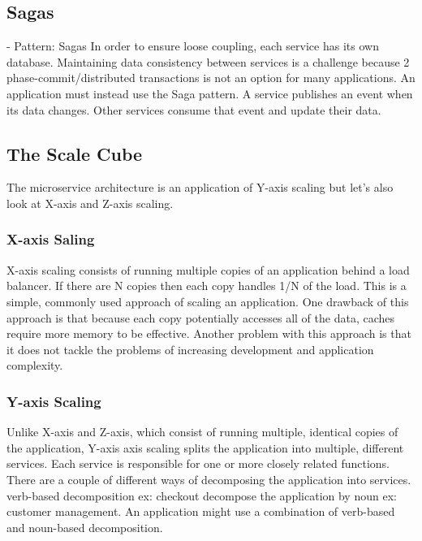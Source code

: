 \subsection{Sagas}
\label{subse:sagas}
- Pattern: Sagas \cite{RichardsonMicroservicesSagas}
  In order to ensure loose coupling, each service has its own database. Maintaining data consistency between services is a challenge because 2 phase-commit/distributed transactions is not an option for many applications. An application must instead use the Saga pattern. A service publishes an event when its data changes. Other services consume that event and update their data.

\subsection{The Scale Cube}
\label{subse:scale_cube}
The microservice architecture is an application of Y-axis scaling but let’s also look at X-axis and Z-axis scaling.

\subsubsection{X-axis Saling}
X-axis scaling consists of running multiple copies of an application behind a load balancer. If there are N copies then each copy handles 1/N of the load. This is a simple, commonly used approach of scaling an application.
One drawback of this approach is that because each copy potentially accesses all of the data, caches require more memory to be effective. Another problem with this approach is that it does not tackle the problems of increasing development and application complexity.

\subsubsection{Y-axis Scaling}
Unlike X-axis and Z-axis, which consist of running multiple, identical copies of the application, Y-axis axis scaling splits the application into multiple, different services. Each service is responsible for one or more closely related functions. There are a couple of different ways of decomposing the application into services.
verb-based decomposition ex: checkout
decompose the application by noun ex: customer management. 
An application might use a combination of verb-based and noun-based decomposition.


